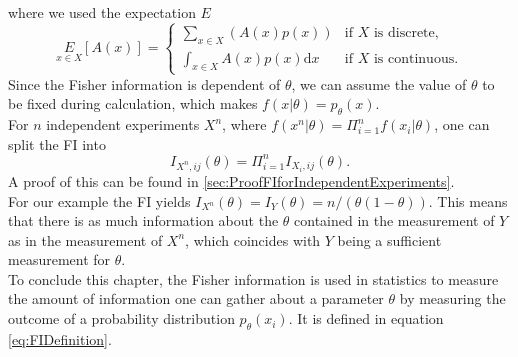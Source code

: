 where we used the expectation $E$
\begin{equation}
	\underset{x\in X}{E} \left[A(x)\right] = 
	\begin{cases}
		\sum_{x\in X} \left(A(x) p(x)\right) &\text{if $X$ is discrete},\\
		\int_{x\in X} A(x) p(x) \mathrm{d}x &\text{if $X$ is continuous}.
	\end{cases}
\end{equation}
Since the Fisher information is dependent of $\theta$, we can assume the value of $\theta$ to be fixed during calculation, which makes $f(x|\theta) = p_\theta(x)$.\\ 
For $n$ independent experiments $X^n$, where $f(x^n|\theta) = \Pi_{i=1}^n f(x_i|\theta)$, one can split the FI into 
\begin{equation}\label{eq:FIforIndependentExperiments}
	I_{X^n,ij}(\theta) = \Pi_{i=1}^n I_{X_i,ij}(\theta).
\end{equation}
A proof of this can be found in \cref{sec:ProofFIforIndependentExperiments}.\\
For our example the FI yields $I_{X^n}(\theta) = I_{Y}(\theta) = n/(\theta(1-\theta))$\cite{StatisticFisherInfoTutorial}. This means that there is as much information about the $\theta$ contained in the measurement of $Y$ as in the measurement of $X^n$, which coincides with $Y$ being a sufficient measurement for $\theta$. \\

To conclude this chapter, the Fisher information is used in statistics to measure the amount of information one can gather about a parameter $\theta$ by measuring the outcome of a probability distribution $p_\theta(x_i)$. It is defined in equation \cref{eq:FIDefinition}.
